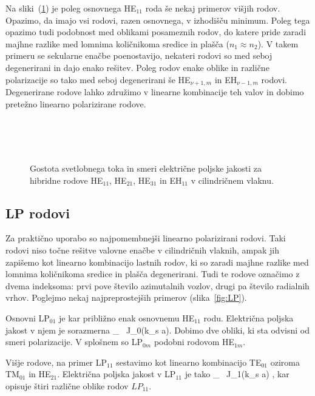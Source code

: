 Na sliki~(\ref{fig:HE11}) je poleg osnovnega HE$_{11}$ roda še nekaj primerov višjih rodov. Opazimo, 
da imajo vsi rodovi, razen osnovnega, v izhodišču minimum. Poleg tega opazimo tudi podobnost med 
oblikami posameznih rodov, do katere pride zaradi majhne razlike med lomnima količnikoma sredice in plašča
($n_1 \approx n_2$). V takem primeru se sekularne enačbe poenostavijo, nekateri rodovi so 
med seboj degenerirani in dajo enako rešitev. Poleg rodov enake oblike in različne polarizacije so tako 
med seboj degenerirani še HE$_{\nu+1,m}$ in EH$_{\nu-1,m}$ rodovi. Degenerirane 
rodove lahko združimo v linearne kombinacije teh valov in dobimo pretežno linearno polarizirane 
rodove. 
\begin{figure}[h]
\centering
\def\svgwidth{90truemm} 
\\
\def\svgwidth{90truemm} 
 \\
\def\svgwidth{90truemm} 
 \\
\def\svgwidth{90truemm} 

\caption{Gostota svetlobnega toka in smeri električne poljske jakosti za hibridne rodove
HE$_{11}$, HE$_{21}$, HE$_{31}$ in EH$_{11}$ v cilindričnem vlaknu.}
\label{fig:HE11}
\end{figure}

\subsection*{LP rodovi}
Za praktično uporabo so najpomembnejši linearno polarizirani rodovi. Taki rodovi niso
točne rešitve valovne enačbe v cilindričnih vlaknih, ampak jih zapišemo kot linearno 
kombinacijo lastnih rodov, ki so zaradi majhne razlike med lomnima količnikoma sredice
in plašča degenerirani. Tudi te rodove označimo z dvema indeksoma: prvi pove število azimutalnih
vozlov, drugi pa število radialnih vrhov. Poglejmo nekaj najpreprostejših primerov (slika~\ref{fig:LP}).

Osnovni LP$_{01}$ je kar približno enak osnovnemu HE$_{11}$ rodu. 
Električna poljska jakost v njem je 
sorazmerna
\beq
{}_  \, J_0(k_s a).
\eeq
Dobimo dve  obliki, ki sta odvisni od smeri polarizacije.
V splošnem so LP$_{0m}$ podobni rodovom HE$_{1m}$. 

Višje rodove, na primer LP$_{11}$ sestavimo kot linearno kombinacijo 
TE$_{01}$ oziroma TM$_{01}$ in HE$_{21}$.
Električna poljska jakost v LP$_{11}$ je tako 
\beq
{}_  \, J_1(k_s a)
{ \cos\varphi \brace \sin\varphi},
\eeq
kar opisuje štiri različne oblike rodov $LP_{11}$.

